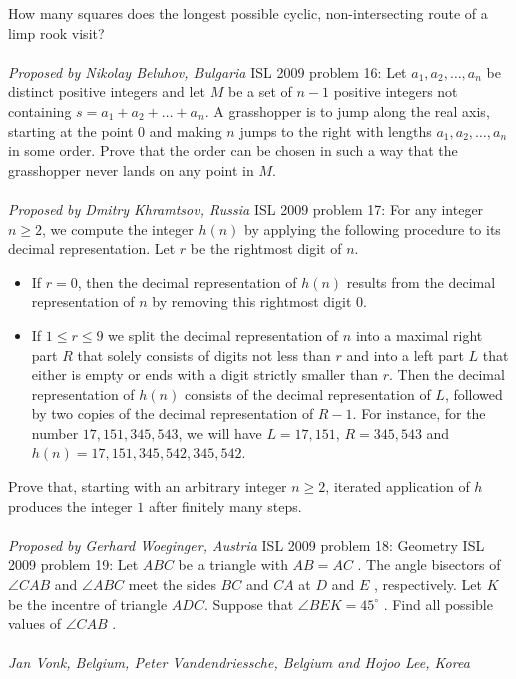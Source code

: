 How many squares does the longest possible cyclic, non-intersecting route of a limp rook visit? \\\\
\textit{Proposed by Nikolay Beluhov, Bulgaria} 
ISL 2009 problem 16:  Let $ a_1, a_2, \ldots , a_n$ be distinct positive integers and let $ M$ be a set of $ n - 1$ positive integers not containing $ s = a_1 + a_2 + \ldots + a_n.$ A grasshopper is to jump along the real axis, starting at the point $ 0$ and making $ n$ jumps to the right with lengths $ a_1, a_2, \ldots , a_n$ in some order. Prove that the order can be chosen in such a way that the grasshopper never lands on any point in $ M.$ \\\\
\textit{Proposed by Dmitry Khramtsov, Russia} 
ISL 2009 problem 17:  For any integer $n\geq 2$, we compute the integer $h(n)$ by applying the following procedure to its decimal representation. Let $r$ be the rightmost digit of $n$.
\begin{itemize}
  \item If $r=0$, then the decimal representation of $h(n)$ results from the decimal representation of $n$ by removing this rightmost digit $0$.
  \item If $1\leq r \leq 9$ we split the decimal representation of $n$ into a maximal right part $R$ that solely consists of digits not less than $r$ and into a left part $L$ that either is empty or ends with a digit strictly smaller than $r$. Then the decimal representation of $h(n)$ consists of the decimal representation of $L$, followed by two copies of the decimal representation of $R-1$. For instance, for the number $17,151,345,543$, we will have $L=17,151$, $R=345,543$ and $h(n)=17,151,345,542,345,542$.
\end{itemize}
Prove that, starting with an arbitrary integer $n\geq 2$, iterated application of $h$ produces the integer $1$ after finitely many steps. \\\\
\textit{Proposed by Gerhard Woeginger, Austria} 
ISL 2009 problem 18:  Geometry 
ISL 2009 problem 19:  Let $ ABC$ be a triangle with $ AB = AC$ . The angle bisectors of $ \angle C AB$ and $ \angle AB C$ meet the sides $ B C$ and $ C A$ at $ D$ and $ E$ , respectively. Let $ K$ be the incentre of triangle $ ADC$. Suppose that $ \angle B E K = 45^\circ$ . Find all possible values of $ \angle C AB$ . \\\\
\textit{Jan Vonk, Belgium, Peter Vandendriessche, Belgium and Hojoo Lee, Korea } 
